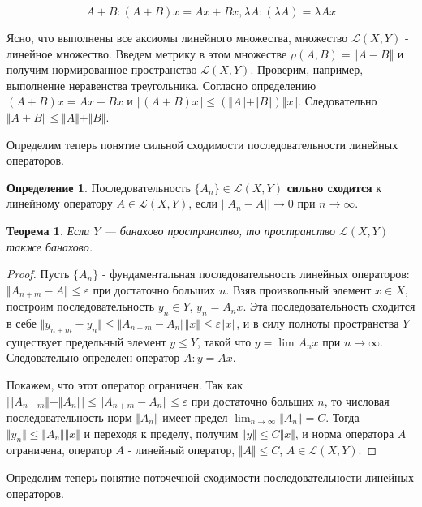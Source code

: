 \documentclass[12pt,a4paper,titlepage,oneside]{book}
\theoremstyle{definition}
\newtheorem*{definition}{Определение}
\theoremstyle{plain}
\newtheorem*{theorem}{Теорема}
\theoremstyle{break}
\theoremstyle{remark}
\theoremstyle{remark}
\theoremstyle{remark}
\theoremstyle{remark}
\theoremstyle{plain}
\theoremstyle{plain}
\begin{document}
$$A+B: (A+B)x = Ax+Bx, \lambda A: (\lambda A) = \lambda Ax$$

Ясно, что выполнены все аксиомы линейного множества, множество $\mathcal{L}(X,Y)$ - линейное множество. Введем метрику в этом множестве $\rho(A, B) = \Vert A-B\Vert$ и получим нормированное пространство $\mathcal{L}(X,Y)$. Проверим, например, выполнение неравенства треугольника. Согласно определению $(A+B)x = Ax+Bx$ и $\Vert(A+B)x\Vert\le(\Vert A\Vert+\Vert B\Vert)\Vert x\Vert$. Следовательно $\Vert A+B\Vert\le\Vert A\Vert+\Vert B\Vert$.

Определим теперь понятие сильной сходимости последовательности линейных операторов.

\begin{definition}
Последовательность $\{A_n\}\in \mathcal{L}(X,Y)$ \textbf{сильно сходится} к линейному оператору $A\in \mathcal{L}(X,Y)$, если $||A_n-A||\to 0$ при $n\to {\infty}$.
\end{definition}

\begin{theorem}
Если $Y$ --- банахово пространство, то пространство $\mathcal{L}(X,Y)$ также банахово.
\end{theorem}

\begin{proof}
Пусть $\{A_n\}$ - фундаментальная последовательность линейных операторов: $\Vert A_{n+m}-A\Vert\le \varepsilon$ при достаточно больших $n$. Взяв произвольный элемент $x\in X$, построим последовательность $y_n\in Y$, $y_n=A_nx$. Эта последовательность сходится в себе $\Vert y_{n+m}-y_n\Vert\le \Vert A_{n+m}-A_n\Vert \Vert x\Vert\le \varepsilon \Vert x\Vert$, и в силу полноты пространства $Y$ существует предельный элемент $y\le Y$, такой что $y=\lim_{} A_nx$ при $n \to \infty$. Следовательно определен оператор $A: y=Ax$.

Покажем, что этот оператор ограничен. Так как $\lvert \Vert A_{n+m} \Vert-\Vert A_n\Vert \rvert \leqslant \Vert A_{n+m}-A_n\Vert \leqslant \varepsilon$ при достаточно больших $n$, то числовая последовательность норм $\Vert A_n\Vert$ имеет предел $\lim_{n\to \infty} \Vert A_n\Vert=C$. Тогда $\Vert y_n\Vert\le\Vert A_n\Vert \Vert x\Vert$ и переходя к пределу, получим $\Vert y\Vert\le C\Vert x\Vert$, и норма оператора $A$ ограничена, оператор $A$ - линейный оператор, $\Vert A\Vert\le C$, $A\in \mathcal{L}(X,Y)$.
\end{proof}

Определим теперь понятие поточечной сходимости последовательности линейных операторов.
\end{document}

